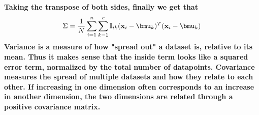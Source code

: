 \documentclass[submit]{harvardml}
\newenvironment{answer}{%
    \color{answergreen}\bf}
  {%
  }
\begin{document}
\begin{enumerate}
\begin{answer}
            Taking the transpose of both sides, finally we get that 
        $$
          \Sigma  =   \frac{1}{N}
            \sum_{i=1}^n \sum_{k=1}^c \mBI (\bx_i - \bmu_k)^T (\bx_i - \bmu_k)
            $$
      Variance is a measure of how "spread out" a dataset is, relative to its
      mean. Thus it makes sense that the inside term looks like a squared error
      term, normalized by the total number of datapoints. Covariance measures the
      spread of multiple datasets and how they relate to each other. If
      increasing in one dimension often corresponds to an increase in
      another dimension, the two dimensions are related through a positive
      covariance matrix. 
      \end{answer}

\end{enumerate}




\end{document}
